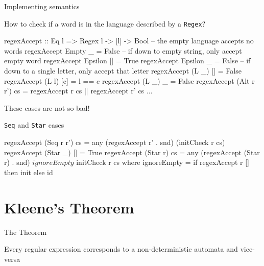 \documentclass{beamer}
\begin{document}
\begin{frame}[fragile]{Implementing semantics}

  How to check if a word is in the language described by a \texttt{Regex}?

  \begin{code}
regexAccept :: Eq l => Regex l -> [l] -> Bool
-- the empty language accepts no words
regexAccept Empty _    = False
-- if down to empty string, only accept empty word
regexAccept Epsilon [] = True  
regexAccept Epsilon _  = False
-- if down to a single letter, only accept that letter 
regexAccept (L _) []   = False
regexAccept (L l) [c]  = l == c
regexAccept (L _) _    = False
regexAccept (Alt r r') cs =
                 regexAccept r cs || regexAccept r' cs
...
\end{code} \vspace

These cases are not so bad!
\end{frame}
\begin{frame}[fragile]{\texttt{Seq} and \texttt{Star} cases}
\begin{code}
regexAccept (Seq r r') cs = any (regexAccept r' . snd)
                                (initCheck r cs)
regexAccept (Star _) [] = True
regexAccept (Star r) cs = 
  any (regexAccept (Star r) . snd) $ ignoreEmpty $ initCheck r cs
  where ignoreEmpty = if regexAccept r [] then init else id 

\end{code}
\end{frame}


\section{Kleene's Theorem}
\begin{frame}{The Theorem}
	\large
	\begin{theorem}
		Every regular expression corresponds to a non-deterministic automata and vice-versa
	\end{theorem}
\end{frame}
\end{document}
